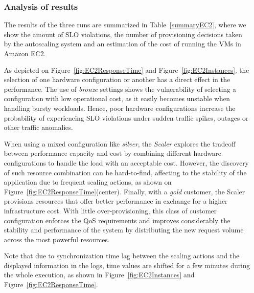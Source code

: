 \subsubsection{Analysis of results}
The results of the three runs are summarized in Table~\ref{summaryEC2}, where we show the amount of SLO violations, the number of provisioning decisions taken by the autoscaling system and an estimation of the cost of running the VMs in Amazon EC2.

As depicted on Figure~\ref{fig:EC2ResponseTime} and Figure~\ref{fig:EC2Instances}, the selection of one hardware configuration or another has a direct effect in the performance. The use of \emph{bronze} settings shows the vulnerability of selecting a configuration with low operational cost, as it easily becomes unstable when handling bursty workloads. Hence, poor hardware configurations increase the probability of experiencing SLO violations under sudden traffic spikes, outages or other traffic anomalies. 

When using a mixed configuration like \emph{silver}, the \emph{Scaler} explores the tradeoff between performance capacity and cost by combining different hardware configurations to handle the load with an acceptable cost. However, the discovery of such resource combination can be hard-to-find, affecting to the stability of the application due to frequent scaling actions, as shown on Figure~\ref{fig:EC2ResponseTime}(center). Finally, with a \emph{gold} customer, the Scaler provisions resources that offer better performance in exchange for a higher infrastructure cost. With little over-provisioning, this class of customer configuration enforces the QoS requirements and improves considerably the stability and performance of the system by distributing the new request volume across the most powerful resources.  

Note that due to synchronization time lag between the scaling actions and the displayed information in the logs, time values are shifted for a few minutes during the whole execution, as shown in Figure~\ref{fig:EC2Instances} and Figure~\ref{fig:EC2ResponseTime}.






